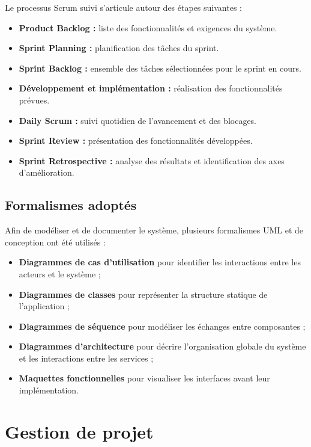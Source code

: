 Le processus Scrum suivi s'articule autour des étapes suivantes :

\begin{itemize}
    \item \textbf{Product Backlog :} liste des fonctionnalités et exigences du système.
    \item \textbf{Sprint Planning :} planification des tâches du sprint.
    \item \textbf{Sprint Backlog :} ensemble des tâches sélectionnées pour le sprint en cours.
    \item \textbf{Développement et implémentation :} réalisation des fonctionnalités prévues.
    \item \textbf{Daily Scrum :} suivi quotidien de l'avancement et des blocages.
    \item \textbf{Sprint Review :} présentation des fonctionnalités développées.
    \item \textbf{Sprint Retrospective :} analyse des résultats et identification des axes d'amélioration.
\end{itemize}

\subsection{Formalismes adoptés}

Afin de modéliser et de documenter le système, plusieurs formalismes UML et
de conception ont été utilisés :

\begin{itemize}
    \item \textbf{Diagrammes de cas d'utilisation} pour identifier les
    interactions entre les acteurs et le système ;
    \item \textbf{Diagrammes de classes} pour représenter la structure
    statique de l'application ;
    \item \textbf{Diagrammes de séquence} pour modéliser les échanges entre
    composantes ;
    \item \textbf{Diagrammes d'architecture} pour décrire l'organisation
    globale du système et les interactions entre les services ;
    \item \textbf{Maquettes fonctionnelles} pour visualiser les interfaces
    avant leur implémentation.
\end{itemize}

\section{Gestion de projet}

